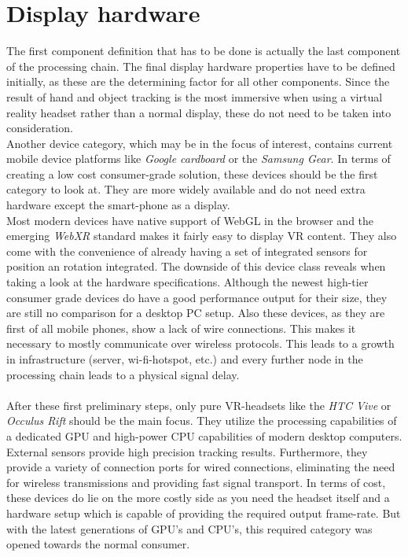 \section{Display hardware}
The first component definition that has to be done is actually the last component of the processing chain. The final display hardware properties have to be defined initially, as these are the determining factor for all other components. Since the result of hand and object tracking is the most immersive when using a virtual reality headset rather than a normal display, these do not need to be taken into consideration.\\
Another device category, which may be in the focus of interest, contains current mobile device platforms like \textit{Google cardboard} or the \textit{Samsung Gear}. In terms of creating a low cost consumer-grade solution, these devices should be the first category to look at. They are more widely available and do not need extra hardware except the smart-phone as a display. \\Most modern devices have native support of WebGL in the browser and the emerging \textit{WebXR} standard makes it fairly easy to display VR content. They also come with the convenience of already having a set of integrated sensors for position an rotation integrated. The downside of this device class reveals when taking a look at the hardware specifications. Although the newest high-tier consumer grade devices do have a good performance output for their size, they are still no comparison for a desktop PC setup. Also these devices, as they are first of all mobile phones, show a lack of wire connections. This makes it necessary to mostly communicate over wireless protocols. This leads to a growth in infrastructure (server, wi-fi-hotspot, etc.) and every further node in the processing chain leads to a physical signal delay.\\\\
After these first preliminary steps, only pure VR-headsets like the \textit{HTC Vive} \cite{HTC.2018} or \textit{Occulus Rift} \cite{OculusVR.2018} should be the main focus. They utilize the processing capabilities of a dedicated GPU and high-power CPU capabilities of modern desktop computers. External sensors provide high precision tracking results. Furthermore, they provide a variety of connection ports for wired connections, eliminating the need for wireless transmissions and providing fast signal transport. In terms of cost, these devices do lie on the more costly side as you need the headset itself and a hardware setup which is capable of providing the required output frame-rate. But with the latest generations of GPU's and CPU's, this required category was opened towards the normal consumer.\\\\
